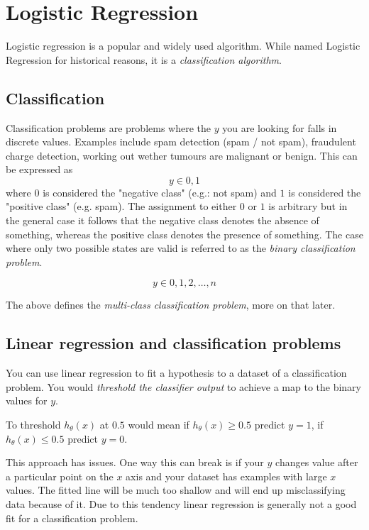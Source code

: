 
\chapter{Logistic Regression}
Logistic regression is a popular and widely used algorithm. While named Logistic Regression for historical reasons, it is a \emph{classification algorithm}.

\section{Classification}
Classification problems are problems where the $y$ you are looking for falls in discrete values. Examples include spam detection (spam / not spam), fraudulent charge detection, working out wether tumours are malignant or benign. This can be expressed as
\[y \in {0, 1}\]
where $0$ is considered the "negative class" (e.g.: not spam) and $1$ is considered the "positive class" (e.g. spam). The assignment to either $0$ or $1$ is arbitrary but in the general case it follows that the negative class denotes the absence of something, whereas the positive class denotes the presence of something.
The case where only two possible states are valid is referred to as the \emph{binary classification problem}.

\[ y \in {0, 1, 2, \dotsc, n} \]

The above defines the \emph{multi-class classification problem}, more on that later.

\section{Linear regression and classification problems}

You can use linear regression to fit a hypothesis to a dataset of a classification problem. You would \emph{threshold the classifier output} to achieve a map to the binary values for $y$.

To threshold $h_\theta(x)$ at $0.5$ would mean if  $h_\theta(x) \ge 0.5$ predict $y=1$, if $h_\theta(x) \leq 0.5$ predict $y=0$.

This approach has issues. One way this can break is if your $y$ changes value after a particular point on the $x$ axis and your dataset has examples with large $x$ values. The fitted line will be much too shallow and will end up misclassifying data because of it. Due to this tendency linear regression is generally not a good fit for a classification problem.

